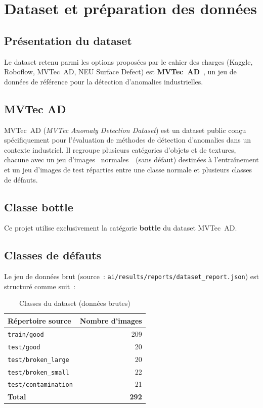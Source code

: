 \chapter{Dataset et pr\'eparation des donn\'ees}
\label{ch:dataset}

\section{Pr\'esentation du dataset}

Le dataset retenu parmi les options propos\'ees par le cahier des charges (Kaggle, Roboflow, MVTec~AD, NEU Surface Defect) est \textbf{MVTec~AD}~\cite{mvtecad}, un jeu de donn\'ees de r\'ef\'erence pour la d\'etection d'anomalies industrielles.

\section{MVTec AD}

MVTec~AD (\emph{MVTec Anomaly Detection Dataset}) est un dataset public con\c{c}u sp\'ecifiquement pour l'\'evaluation de m\'ethodes de d\'etection d'anomalies dans un contexte industriel. Il regroupe plusieurs cat\'egories d'objets et de textures, chacune avec un jeu d'images \guillemotleft~normales~\guillemotright\ (sans d\'efaut) destin\'ees \`a l'entra\^inement et un jeu d'images de test r\'eparties entre une classe normale et plusieurs classes de d\'efauts.

\section{Classe bottle}

Ce projet utilise exclusivement la cat\'egorie \textbf{bottle} du dataset MVTec~AD.

\section{Classes de d\'efauts}

Le jeu de donn\'ees brut (source~: \texttt{ai/results/reports/dataset\_report.json}) est structur\'e comme suit~:

\begin{table}[H]
\centering
\caption{Classes du dataset (donn\'ees brutes)}
\label{tab:dataset-brut}
\begin{tabular}{lr}
\toprule
R\'epertoire source & Nombre d'images \\
\midrule
\texttt{train/good} & 209 \\
\texttt{test/good} & 20 \\
\texttt{test/broken\_large} & 20 \\
\texttt{test/broken\_small} & 22 \\
\texttt{test/contamination} & 21 \\
\midrule
\textbf{Total} & \textbf{292} \\
\bottomrule
\end{tabular}
\end{table}

